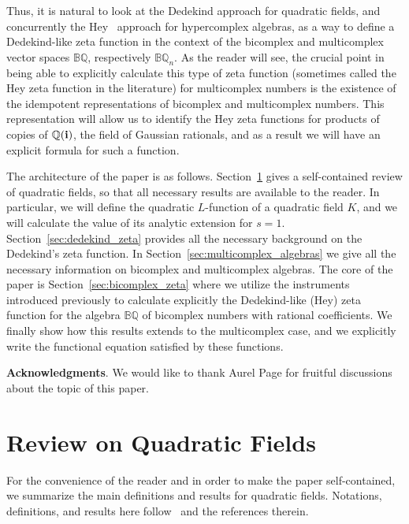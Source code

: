 \documentclass[reqno]{amsart}
\theoremstyle{plain}
\theoremstyle{definition}
\theoremstyle{remark}
\numberwithin{equation}{section}
\begin{document}
Thus, it is natural to look at the Dedekind approach for quadratic
fields, and concurrently the Hey~\cite{hey} approach for hypercomplex
algebras, as a way to define a Dedekind-like zeta function in the
context of the bicomplex and multicomplex vector spaces ${{\mathbb B}{\mathbb Q}}$,
respectively ${{\mathbb B}{\mathbb Q}}_n$.  As the reader will see, the crucial point in
being able to explicitly calculate this type of zeta function
(sometimes called the Hey zeta function in the literature) for
multicomplex numbers is the existence of the idempotent
representations of bicomplex and multicomplex numbers. This
representation will allow us to identify the Hey zeta functions for
products of copies of ${{\mathbb Q}}({{\bf i}})$, the field of Gaussian rationals, and
as a result we will have an explicit formula for such a function.

  

\bigskip

The architecture of the paper is as
follows. Section~\ref{sec:quadratic_fields} gives a self-contained
review of quadratic fields, so that all necessary results are
available to the reader. In particular, we will define the quadratic
$L$-function of a quadratic field $K$, and we will calculate the value
of its analytic extension for $s=1.$ Section~\ref{sec:dedekind_zeta}
provides all the necessary background on the Dedekind's zeta
function. In Section~\ref{sec:multicomplex_algebras} we give all the
necessary information on bicomplex and multicomplex algebras. The core
of the paper is Section~\ref{sec:bicomplex_zeta} where we utilize the
instruments introduced previously to calculate explicitly the
Dedekind-like (Hey) zeta function for the algebra ${{\mathbb B}{\mathbb Q}}$ of bicomplex
numbers with rational coefficients. We finally show how this results
extends to the multicomplex case, and we explicitly write the
functional equation satisfied by these functions.

{\bf Acknowledgments}. We would like to thank Aurel Page for fruitful
discussions about the topic of this paper.

\bigskip

\section{Review on Quadratic Fields}
\label{sec:quadratic_fields}

For the convenience of the reader and in order to make the paper
self-contained, we summarize the main definitions and results for
quadratic fields. Notations, definitions, and results here
follow~\cite{ireland,neukirch} and the references therein.  
\end{document}

